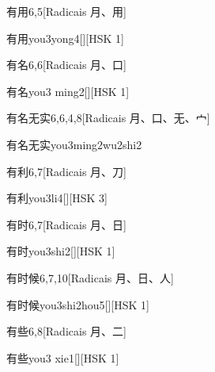 \begin{entry}{有用}{6,5}[Radicais ⽉、⽤]
  \begin{phonetics}{有用}{you3yong4}[][HSK 1]
  \end{phonetics}
\end{entry}

\begin{entry}{有名}{6,6}[Radicais ⽉、⼝]
  \begin{phonetics}{有名}{you3 ming2}[][HSK 1]
  \end{phonetics}
\end{entry}

\begin{entry}{有名无实}{6,6,4,8}[Radicais ⽉、⼝、⽆、⼧]
  \begin{phonetics}{有名无实}{you3ming2wu2shi2}
  \end{phonetics}
\end{entry}

\begin{entry}{有利}{6,7}[Radicais ⽉、⼑]
  \begin{phonetics}{有利}{you3li4}[][HSK 3]
  \end{phonetics}
\end{entry}

\begin{entry}{有时}{6,7}[Radicais ⽉、⽇]
  \begin{phonetics}{有时}{you3shi2}[][HSK 1]
  \end{phonetics}
\end{entry}

\begin{entry}{有时候}{6,7,10}[Radicais ⽉、⽇、⼈]
  \begin{phonetics}{有时候}{you3shi2hou5}[][HSK 1]
  \end{phonetics}
\end{entry}

\begin{entry}{有些}{6,8}[Radicais ⽉、⼆]
  \begin{phonetics}{有些}{you3 xie1}[][HSK 1]
  \end{phonetics}
\end{entry}

